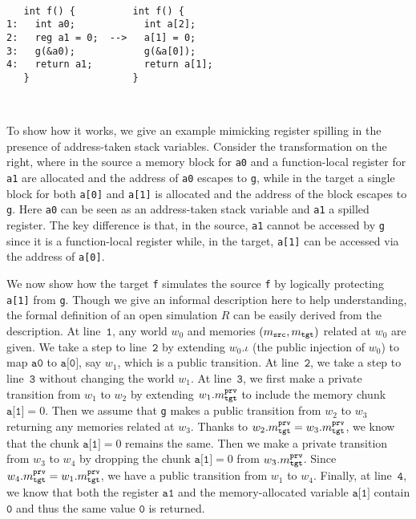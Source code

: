 \begin{minipage}{1\textwidth}
\mbox{}\\[-7mm]    
\begin{Verbatim}
   int f() {          int f() {     
1:   int a0;            int a[2];   
2:   reg a1 = 0;  -->   a[1] = 0;   
3:   g(&a0);            g(&a[0]);   
4:   return a1;         return a[1];
   }                  }
\end{Verbatim}
\mbox{}\\[-10mm]
\end{minipage}
To show how it works,
we give an example mimicking register spilling
in the presence of address-taken stack variables.
Consider the transformation on the right, where
in the source a memory block for \texttt{a0} and a function-local register for \texttt{a1} are allocated and
the address of \texttt{a0} escapes to \texttt{g},
while in the target a single block for both \texttt{a[0]} and \texttt{a[1]}
is allocated and the address of the block escapes to \texttt{g}.
Here \texttt{a0} can be seen as an address-taken stack variable and \texttt{a1} a spilled register.
The key difference is that, in the source, \texttt{a1} cannot be accessed by
\texttt{g} since it is a function-local register
while, in the target, \texttt{a[1]} can be accessed via the address of \texttt{a[0]}.

We now show how the target \texttt{f} simulates the source \texttt{f}
by logically protecting \texttt{a[1]} from \texttt{g}.
Though we give an informal description here to help understanding,
the formal definition of an open simulation $R$ 
can be easily derived from the description.
At line~$\texttt{1}$, any world $w_0$ and
memories $(m_{\texttt{src}}, m_{\texttt{tgt}})$ related at $w_0$ are given. We take a step
to line~$\texttt{2}$ by extending $w_0.\iota$ (\ie the public
injection of $w_0$) to map $\texttt{a0}$ to $\texttt{a[0]}$, say $w_1$,
which is a public transition. At line~$\texttt{2}$, we take a step
to line~$\texttt{3}$ without changing the world $w_1$.
At line~$\texttt{3}$, we first make a private transition from $w_1$
to $w_2$ by extending $w_1.m^{\texttt{prv}}_{\texttt{tgt}}$
to include the memory chunk $\texttt{a[1]} = 0$.
Then we assume that \texttt{g} makes a public transition from $w_2$ to $w_3$
returning any memories related at $w_3$. Thanks to $w_2.m^{\texttt{prv}}_{\texttt{tgt}} = w_3.m^{\texttt{prv}}_{\texttt{tgt}}$,
we know that the chunk $\texttt{a[1]} = 0$ remains the same.
Then we make a private transition from $w_3$ to $w_4$ by
dropping the chunk $\texttt{a[1]} = 0$ from $w_3.m^{\texttt{prv}}_{\texttt{tgt}}$.
Since $w_4.m^{\texttt{prv}}_{\texttt{tgt}} = w_1.m^{\texttt{prv}}_{\texttt{tgt}}$, we have a public transition from $w_1$ to $w_4$.
Finally, at line~$\texttt{4}$, we know that both the register $\texttt{a1}$ and
the memory-allocated variable $\texttt{a[1]}$ contain
$\texttt{0}$ and thus the same value $\texttt{0}$ is returned.

